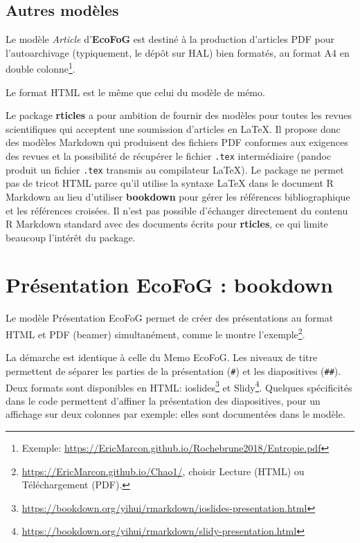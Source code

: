 \documentclass[
  11pt,
  french,
  a4paper,
  extrafontsizes,onecolumn,openright
  ]{memoir}
\begin{document}
\hypertarget{autres-moduxe8les}{%
\subsection{Autres modèles}\label{autres-moduxe8les}}

Le modèle \emph{Article} d'\textbf{EcoFoG} est destiné à la production d'articles PDF pour l'autoarchivage (typiquement, le dépôt sur HAL) bien formatés, au format A4 en double colonne\footnote{Exemple: \url{https://EricMarcon.github.io/Rochebrune2018/Entropie.pdf}}.

Le format HTML est le même que celui du modèle de mémo.

Le package \textbf{rticles} a pour ambition de fournir des modèles pour toutes les revues scientifiques qui acceptent une soumission d'articles en LaTeX.
Il propose donc des modèles Markdown qui produisent des fichiers PDF conformes aux exigences des revues et la possibilité de récupérer le fichier \texttt{.tex} intermédiaire (pandoc produit un fichier \texttt{.tex} transmis au compilateur LaTeX).
Le package ne permet pas de tricot HTML parce qu'il utilise la syntaxe LaTeX dans le document R Markdown au lieu d'utiliser \textbf{bookdown} pour gérer les références bibliographique et les références croisées.
Il n'est pas possible d'échanger directement du contenu R Markdown standard avec des documents écrits pour \textbf{rticles}, ce qui limite beaucoup l'intérêt du package.

\hypertarget{pruxe9sentation-ecofog-bookdown}{%
\section{Présentation EcoFoG : bookdown}\label{pruxe9sentation-ecofog-bookdown}}

Le modèle Présentation EcoFoG permet de créer des présentations au format HTML et PDF (beamer) simultanément, comme le montre l'exemple\footnote{\url{https://EricMarcon.github.io/Chao1/}, choisir Lecture (HTML) ou Téléchargement (PDF).}.

La démarche est identique à celle du Memo EcoFoG. Les niveaux de titre permettent de séparer les parties de la présentation (\texttt{\#}) et les diapositives (\texttt{\#\#}).
Deux formats sont disponibles en HTML: ioslides\footnote{\url{https://bookdown.org/yihui/rmarkdown/ioslides-presentation.html}} et Slidy\footnote{\url{https://bookdown.org/yihui/rmarkdown/slidy-presentation.html}}.
Quelques spécificités dans le code permettent d'affiner la présentation des diapositives, pour un affichage sur deux colonnes par exemple: elles sont documentées dans le modèle.
\end{document}
